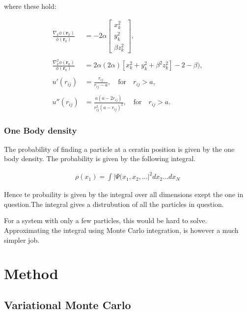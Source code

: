 \documentclass[
]{article}
\begin{document}
where these hold:

\begin{align*}
\frac{\nabla_k \phi(\mathbf{r}_k)}{\phi(\mathbf{r}_k)} &= -2\alpha \left[
\begin{matrix}
x_k^2 \\ y_k^2 \\ \beta z_k^2
\end{matrix}\right], \\ \\
\frac{\nabla_k^2 \phi(\mathbf{r}_k)}{\phi(\mathbf{r}_k)} &= 2\alpha (2\alpha)[x_k^2 + y_k^2 + \beta^2z_k^2] - 2 - \beta),\\ \\
u'(r_{ij}) &= \frac{r_{ij}}{r_{ij}-a}, \quad \text{for}  \quad r_{ij}  > a, \\ \\
u''(r_{ij}) &= \frac{a(a-2r_{ij})}{r_{ij}^2(a-r_{ij})^2}, \quad \text{for} \quad r_{ij}  > a.
\end{align*}

\hypertarget{one-body-density}{%
\subsubsection{One Body density}\label{one-body-density}}

The probability of finding a particle at a ceratin position is given by
the one body density. The probability is given by the following
integral.

\begin{align*}
  \rho(x_1) = \int{|\Psi(x_1, x_2,...|^2 dx_2 ...dx_N}
\end{align*}

Hence te probaility is given by the integral over all dimensions exept
the one in question.The integral gives a distrubution of all the
particles in question.

For a system with only a few particles, this would be hard to solve.
Approximating the integral using Monte Carlo integration, is however a
much simpler job.

\hypertarget{method}{%
\section{Method}\label{method}}

\hypertarget{variational-monte-carlo}{%
\subsection{Variational Monte Carlo}\label{variational-monte-carlo}}
\end{document}
